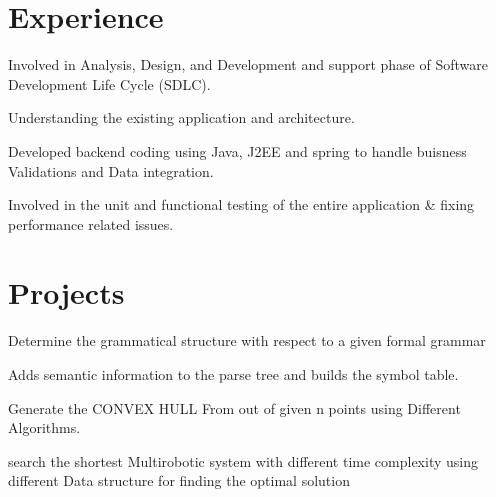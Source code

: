 \documentclass[]{deedy-resume-openfont}
\begin{document}
\begin{minipage}[t]{0.66\textwidth} 
\section{Experience}
\sectionsep
{}
\vspace{\topsep}
\vspace{\topsep}
\begin{tightemize}
\item Involved in Analysis, Design, and Development and support phase of Software Development Life Cycle (SDLC).
\item Understanding the existing application and architecture.
\item Developed backend coding using Java, J2EE and spring to handle buisness Validations and Data integration.
\item Involved in the unit and functional testing of the entire application \& fixing performance related issues.
\end{tightemize} 

\sectionsep

\section{Projects}

\vspace{\topsep}
\vspace{\topsep}
\begin{tightemize}
\item Determine the grammatical structure with respect to a given formal grammar
\item Adds semantic information to the parse tree and builds the symbol table.
\end{tightemize}
\sectionsep

\vspace{\topsep} %
\begin{tightemize}
\item Generate the CONVEX HULL From out of given n points using Different
Algorithms. 
\item search the shortest Multirobotic system with different time complexity using
different Data structure for finding the optimal solution 


\end{tightemize}
\end{minipage}
\end{document}
